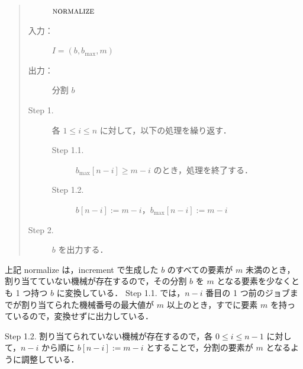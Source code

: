 \documentclass[12pt]{optlab-bachelor}
\begin{document}
\begin{quote}
  \begin{description}
    \item[]  ${\mbox {\bf {\sc normalize}}}$
    \item[入力：] $I = (b, b_{\max}, m)$
    \item[出力：] 分割 $b$
  \end{description}
  \begin{description}
    \item[Step 1.] 各 $1 \le i \le n$ に対して，以下の処理を繰り返す．
    \begin{description}
      \item[Step 1.1.] $b_{\max}[n - i] \ge m - i$ のとき，処理を終了する．
      \item[Step 1.2.] $b[n - i] := m - i$，$b_{\max}[n - i] := m - i$
    \end{description}
    \item[Step 2.] $b$ を出力する．
  \end{description}
\end{quote}

上記 {\sc normalize} は，{\sc increment} で生成した $b$ のすべての要素が $m$ 未満のとき，割り当てていない機械が存在するので，その分割 $b$ を $m$ となる要素を少なくとも 1 つ持つ $b$ に変換している．
Step 1.1. では，$n - i$ 番目の 1 つ前のジョブまでが割り当てられた機械番号の最大値が $m$ 以上のとき，すでに要素 $m$ を持っているので，変換せずに出力している．

Step 1.2. 割り当てられていない機械が存在するので，各 $0 \le i \le n - 1$ に対して，$n - i$ から順に $b[n-i] := m - i$ とすることで，分割の要素が $m$ となるように調整している．
\end{document}
